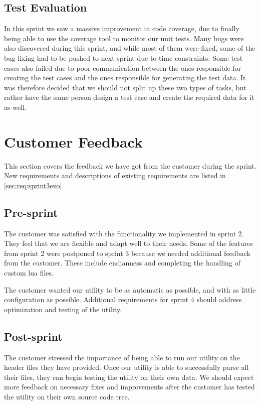 \subsection{Test Evaluation}
In this sprint we saw a massive improvement in code coverage, due to finally being able to use the coverage tool to monitor our unit tests. Many bugs were also discovered during this sprint, and while most of them were fixed, some of the bug fixing had to be pushed to next sprint due to time constraints. Some test cases also failed due to poor communication between the ones responsible for creating the test cases and the ones responsible for generating the test data. It was therefore decided that we should not split up these two types of tasks, but rather have the same person design a test case and create the required data for it as well.


\section{Customer Feedback}
\label{sec:sp3:feedback}
This section covers the feedback we have got from the customer during the 
sprint. New requirements and descriptions of existing requirements are
listed in \autoref{sec:req:sprint3evo}.

\subsection{Pre-sprint}
The customer was satisfied with the functionality we implemented in sprint 2.
They feel that we are flexible and adapt well to their needs.
Some of the features from sprint 2 were postponed to sprint 3 because we
needed additional feedback from the customer. These include \gls{endianness}
and completing the handling of custom \Gls{lua} files.

The customer wanted our \gls{utility} to be as automatic as possible, and with
as little configuration as possible. Additional requirements for sprint 4 should
address optimization and testing of the \gls{utility}.

\subsection{Post-sprint}
The customer stressed the importance of being able to run our \gls{utility} on
the \gls{header} files they have provided. Once our \gls{utility} is able to
successfully parse all their files, they can begin testing the \gls{utility}
on their own data. We should expect more feedback on necessary fixes and
improvements after the customer has tested the \gls{utility} on their own
source code tree.

